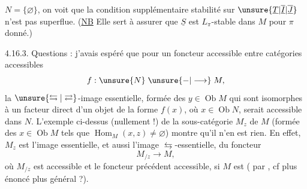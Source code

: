  $N=\{\varnothing\}$, on voit que la condition supplémentaire
 stabilité sur $\unsure{\underline T|\overline{\underline I}|\overline{\underline J}}$ n'est pas
superflue. (\uline{NB} Elle sert à assurer que
$\underline S$ est $L_\pi$-stable dans $M$ pour $\pi$ donné.)

4.16.3. Questions  : j'avais espéré
que pour un foncteur accessible entre
catégories accessibles
\[
f:\unsure{N}\mathrel{\unsure{-|\longrightarrow}}M,
\]
la $\unsure{\leftrightarrows|\rightleftarrows}$-image essentielle, formée des $y\in\operatorname{Ob}M$
qui sont isomorphes à un facteur direct
d'un objet de la forme $f(x)$, où $x\in\operatorname{Ob}N$,
serait accessible dans $N$. L'exemple
ci-dessus (nullement  !) de
la sous-catégorie $M_z$ de $M$ (formée des
$x\in\operatorname{Ob}M$ tels que $\operatorname{Hom}_M(x,z)\ne\varnothing$) montre
qu'il n'en est rien. En effet, $M_z$ est
l'image essentielle, et aussi l'image $\leftrightarrows$-essentielle,
du foncteur
\[
M_{/z}\longrightarrow M,
\]
où $M_{/z}$ est accessible et le foncteur précédent
accessible, si $M$ est  (
par , cf plus  énoncé plus général ?).
